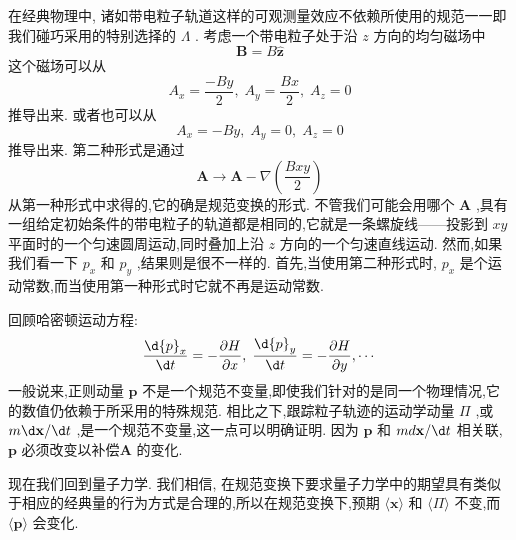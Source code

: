 \documentclass[lang=cn,newtx,10pt,scheme=chinese,thmcnt=section]{elegantbook}
\begin{document}
在经典物理中, 诸如带电粒子轨道这样的可观测量效应不依赖所使用的规范一一即我们碰巧采用的特别选择的 $\Lambda$ . 考虑一个带电粒子处于沿 $z$ 方向的均匀磁场中
\begin{equation}
	\mathbf{B} = B\widehat{\mathbf{z}}
\end{equation}
这个磁场可以从
\begin{equation}
	{A}_{x} = \frac{-{By}}{2},\;{A}_{y} = \frac{Bx}{2},\;{A}_{z} = 0
\end{equation}
推导出来. 或者也可以从
\begin{equation}
	{A}_{x} = - {By},\;{A}_{y} = 0,\;{A}_{z} = 0
\end{equation}
推导出来. 第二种形式是通过
\begin{equation}
	\mathbf{A} \rightarrow \mathbf{A} - \nabla \left( \frac{Bxy}{2}\right)
\end{equation}
从第一种形式中求得的,它的确是规范变换的形式. 不管我们可能会用哪个 $\mathbf{A}$ ,具有一组给定初始条件的带电粒子的轨道都是相同的,它就是一条螺旋线——投影到 ${xy}$ 平面时的一个匀速圆周运动,同时叠加上沿 $z$ 方向的一个匀速直线运动. 然而,如果我们看一下 ${p}_{x}$ 和 ${p}_{y}$ ,结果则是很不一样的. 首先,当使用第二种形式时, ${p}_{x}$ 是个运动常数,而当使用第一种形式时它就不再是运动常数.

回顾哈密顿运动方程:
\begin{equation}
	\frac{\d {p}_{x}}{\d t} = - \frac{\partial H}{\partial x},\;\frac{\d {p}_{y}}{\d t} = - \frac{\partial H}{\partial y},\cdots
\end{equation}
一般说来,正则动量 $\mathbf{p}$ 不是一个规范不变量,即使我们针对的是同一个物理情况,它的数值仍依赖于所采用的特殊规范. 相比之下,跟踪粒子轨迹的运动学动量 $\Pi$ ,或 ${m\d}\mathbf{x}/{\d t}$ ,是一个规范不变量,这一点可以明确证明. 因为 $\mathbf{p}$ 和 ${md}\mathbf{x}/{\d t}$ 相关联, $\mathbf{p}$ 必须改变以补偿$\mathbf{A}$ 的变化.

现在我们回到量子力学. 我们相信, 在规范变换下要求量子力学中的期望具有类似于相应的经典量的行为方式是合理的,所以在规范变换下,预期 $\langle \mathbf{x}\rangle$ 和 $\langle \Pi \rangle$ 不变,而 $\langle \mathbf{p}\rangle$ 会变化.
\end{document}
